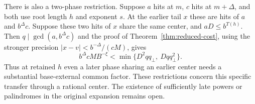 There is also a two-phase restriction. Suppose \(a\) hits at
\(m\), \(c\) hits at \(m+\Delta\), and both use root length \(h\)
and exponent \(s\). At the earlier tail \(x\) these are hits
of \(a\) and \(b^\Delta c\). Suppose these two hits of \(x\)
share the same center, and \(aD\le b^{T(h)}\).
Then \(q\mid\gcd(a,b^\Delta c)\) and the proof of
Theorem~\ref{thm:reduced-cost}, using the stronger precision
\(|x-v|<b^{-\Delta}/(cM)\), gives
\[
 b^\Delta c M B^{-\xi}
   < \min\{D^2 q q_\perp,\ D q q_\perp^2\}.
\]
Thus at retained \(h\) even a later phase sharing an earlier
center needs a substantial base-external common factor.
These restrictions concern this specific transfer through a
rational center. The existence of sufficiently late powers or
palindromes in the original expansion remains open.

